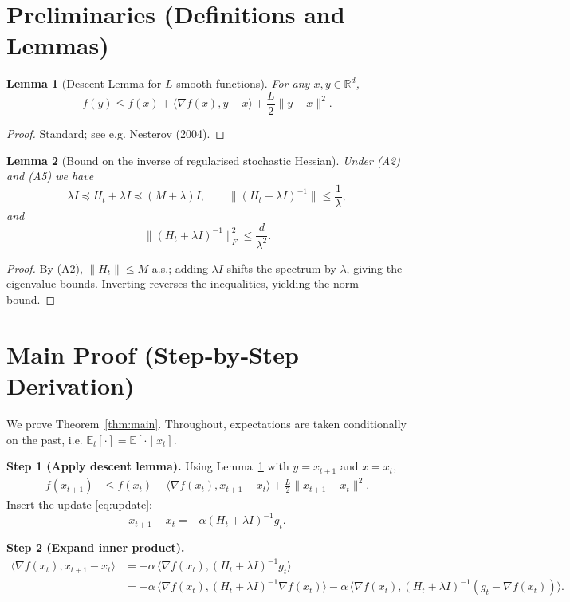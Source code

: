 \documentclass{article}
\newtheorem{lemma}{Lemma}
\newcommand{\EE}{\mathbb{E}}
\newcommand{\RR}{\mathbb{R}}
\newcommand{\ip}[2]{\langle #1,#2\rangle}
\begin{document}
\newpage
\section*{Preliminaries (Definitions and Lemmas)}
\begin{lemma}[Descent Lemma for $L$‑smooth functions]
\label{lem:descent}
For any $x,y\in\RR^{d}$,
\[
f(y)\le f(x)+\ip{\nabla f(x)}{y-x}
+\frac{L}{2}\|y-x\|^{2}.
\tag{L1}
\]
\end{lemma}
\begin{proof}
Standard; see e.g. Nesterov (2004). \qedhere
\end{proof}

\begin{lemma}[Bound on the inverse of regularised stochastic Hessian]
\label{lem:inverse}
Under (A2) and (A5) we have
\[
\lambda I\preceq H_t+\lambda I\preceq (M+\lambda)I,
\qquad
\|(H_t+\lambda I)^{-1}\|\le\frac{1}{\lambda},
\tag{L2}
\]
and
\[
\|(H_t+\lambda I)^{-1}\|_{F}^{2}\le\frac{d}{\lambda^{2}}.
\]
\end{lemma}
\begin{proof}
By (A2), $\|H_t\|\le M$ a.s.; adding $\lambda I$ shifts the spectrum
by $\lambda$, giving the eigenvalue bounds.  Inverting reverses the
inequalities, yielding the norm bound. \qedhere
\end{proof}

\section*{Main Proof (Step‑by‑Step Derivation)}
We prove Theorem~\ref{thm:main}.  Throughout, expectations are taken
conditionally on the past, i.e. $\EE_t[\cdot]=\EE[\cdot\mid x_t]$.

\bigskip
\noindent\textbf{Step 1 (Apply descent lemma).}  
Using Lemma~\ref{lem:descent} with $y=x_{t+1}$ and $x=x_t$,
\begin{align}
f(x_{t+1})
&\le f(x_t)+\ip{\nabla f(x_t)}{x_{t+1}-x_t}
+\frac{L}{2}\|x_{t+1}-x_t\|^{2}. \tag{S1}
\end{align}
Insert the update \eqref{eq:update}:
\[
x_{t+1}-x_t=-\alpha (H_t+\lambda I)^{-1}g_t.
\]

\noindent\textbf{Step 2 (Expand inner product).}
\begin{align}
\ip{\nabla f(x_t)}{x_{t+1}-x_t}
&= -\alpha\,\ip{\nabla f(x_t)}{(H_t+\lambda I)^{-1}g_t} \nonumber\\
&= -\alpha\,\ip{\nabla f(x_t)}{(H_t+\lambda I)^{-1}\nabla f(x_t)}
   -\alpha\,\ip{\nabla f(x_t)}{(H_t+\lambda I)^{-1}(g_t-\nabla f(x_t))}.
\tag{S2}
\end{align}
\end{document}
